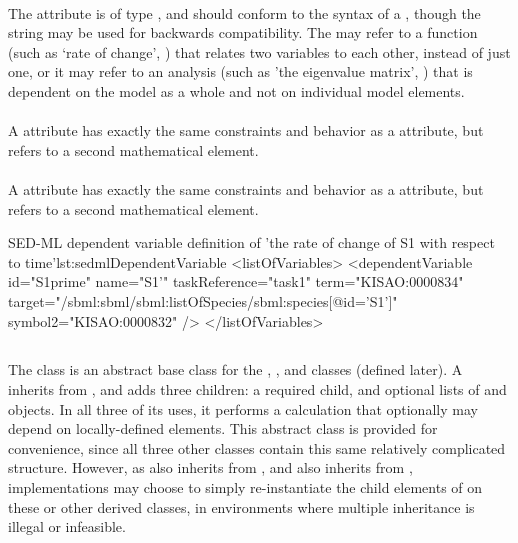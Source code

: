 \begin{blockChanged}
\paragraph*{}
\label{sec:term}
The  attribute is of type , and should conform to the syntax of a \kisaoID, though the string  may be used for backwards compatibility.  The  may refer to a function (such as `rate of change', ) that relates two variables to each other, instead of just one, or it may refer to an analysis (such as 'the eigenvalue matrix', ) that is dependent on the model as a whole and not on individual model elements.

\paragraph*{}
\label{sec:target2}
A  attribute has exactly the same constraints and behavior as a  attribute, but refers to a second mathematical element.

\paragraph*{}
\label{sec:symbol2}
A  attribute has exactly the same constraints and behavior as a  attribute, but refers to a second mathematical element.


\begin{myXmlLst}{SED-ML dependent variable definition of 'the rate of change of S1 with respect to time'}{lst:sedmlDependentVariable}
<listOfVariables>
	<dependentVariable id="S1prime" name="S1'"  taskReference="task1"
		term="KISAO:0000834"
		target="/sbml:sbml/sbml:listOfSpecies/sbml:species[@id='S1']"
		symbol2="KISAO:0000832" />
</listOfVariables>
\end{myXmlLst}


\subsection{}
\label{class:calculation}
\label{class:listOfVariables}
\label{class:listOfParameters}

The \Calculation class is an abstract base class for the \ComputeChange, \DataGenerator, and \FunctionalRange classes (defined later).  A \Calculation inherits from \SedBase, and adds three children:  a required \Math child, and optional lists of \Variable and \Parameter objects.  In all three of its uses, it performs a calculation that optionally may depend on locally-defined elements.  This abstract class is provided for convenience, since all three other classes contain this same relatively complicated structure.  However, as \FunctionalRange also inherits from \Range, and \ComputeChange also inherits from \Change, implementations may choose to simply re-instantiate the child elements of \Calculation on these or other derived classes, in environments where multiple inheritance is illegal or infeasible.


\end{blockChanged}
